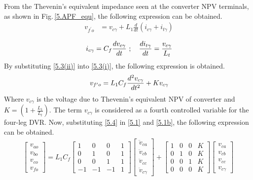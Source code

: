 From the Thevenin's equivalent impedance seen at the converter NPV terminals, as shown in Fig.\,\ref{5.APF_equ}, the following expression can be obtained.
\begin{equation} \label{5.3(i)} %
\begin{aligned}
\ v_{f^{\prime}o} & = v_{c\gamma} + L_{1} \frac{d}{dt}(i_{c\gamma} + i_{t\gamma}) \\
\end{aligned}
\end{equation}
\begin{equation} \label{5.3(ii)} %
\ i_{c\gamma} = C_{f} \frac{dv_{c\gamma}}{dt}~ ; ~~~ \frac{di_{t\gamma}}{dt} = \frac{v_{c\gamma}}{L_{t}}  \\
\end{equation}
By substituting \eqref{5.3(ii)} into \eqref{5.3(i)}, the following expression is obtained.
\begin{equation} \label{5.4} %
\ v_{f^{\prime}o} = L_{1}C_{f} \frac{d^{2} v_{c\gamma}}{dt^{2}}+ K v_{c\gamma}  \\
\end{equation}
Where $v_{c\gamma}$ is the voltage due to Thevenin's equivalent NPV of converter and $K = (1 + \frac{L_{1}}{L_{t}} ) $. The term $v_{c\gamma}$ is considered as a fourth controlled variable for the four-leg DVR. Now, substituting \eqref{5.4} in \eqref{5.1} and \eqref{5.1b}, the following expression can be obtained.
\begin{equation*} 
\begin{aligned}
	\begin{bmatrix}
	v_{ao}\\
	v_{bo}\\
	v_{co}\\
	v_{fo}
	\end{bmatrix}
	= L_{1} C_{f}
	\begin{bmatrix}
	1  & 0       & 0       & 1 \\
	0       & 1  & 0       & 1 \\
	0       & 0       & 1  & 1 \\
	-1 & -1 & -1 & 1
	\end{bmatrix}
	\begin{bmatrix}
	\ddot{v}_{ca}\\
	\ddot{v}_{cb}\\
	\ddot{v}_{cc}\\
	\ddot{v}_{c\gamma}
	\end{bmatrix}
	+
	\begin{bmatrix}
	1  & 0       & 0       & K \\
	0       & 1  & 0       & K \\
	0       & 0       & 1  & K \\
	0 & 0 & 0 & K
	\end{bmatrix}
	\begin{bmatrix}
	v_{ca}\\
	v_{cb}\\
	v_{cc}\\
	v_{c\gamma}
	\end{bmatrix}
\end{aligned}
\end{equation*} 

